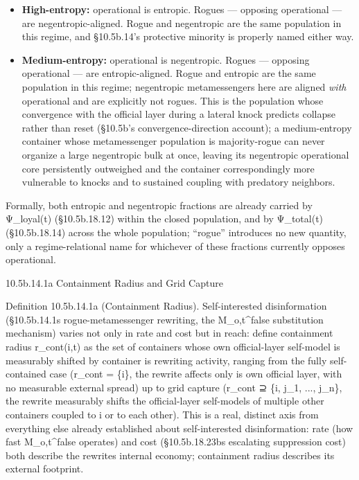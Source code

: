\documentclass[
]{article}
\begin{document}
\begin{itemize}
\item
  \textbf{High-entropy:} operational is entropic. Rogues --- opposing
  operational --- are negentropic-aligned. Rogue and negentropic are the
  same population in this regime, and §10.5b.14's protective minority is
  properly named either way.
\item
  \textbf{Medium-entropy:} operational is negentropic. Rogues ---
  opposing operational --- are entropic-aligned. Rogue and entropic are
  the same population in this regime; negentropic metamessengers here
  are aligned \emph{with} operational and are explicitly not rogues.
  This is the population whose convergence with the official layer
  during a lateral knock predicts collapse rather than reset (§10.5b's
  convergence-direction account); a medium-entropy container whose
  metamessenger population is majority-rogue can never organize a large
  negentropic bulk at once, leaving its negentropic operational core
  persistently outweighed and the container correspondingly more
  vulnerable to knocks and to sustained coupling with predatory
  neighbors.
\end{itemize}

Formally, both entropic and negentropic fractions are already carried by
Ψ\_loyal(t) (§10.5b.18.12) within the closed population, and by
Ψ\_total(t) (§10.5b.18.14) across the whole population; ``rogue''
introduces no new quantity, only a regime-relational name for whichever
of these fractions currently opposes operational.

10.5b.14.1a Containment Radius and Grid Capture

Definition 10.5b.14.1a (Containment Radius). Self-interested
disinformation (§10.5b.14.1s rogue-metamessenger rewriting, the
M\_o,t\^{}false substitution mechanism) varies not only in rate and cost
but in reach: define containment radius r\_cont(i,t) as the set of
containers whose own official-layer self-model is measurably shifted by
container is rewriting activity, ranging from the fully self-contained
case (r\_cont = \{i\}, the rewrite affects only is own official layer,
with no measurable external spread) up to grid capture (r\_cont ⊇ \{i,
j\_1, ..., j\_n\}, the rewrite measurably shifts the official-layer
self-models of multiple other containers coupled to i or to each other).
This is a real, distinct axis from everything else already established
about self-interested disinformation: rate (how fast M\_o,t\^{}false
operates) and cost (§10.5b.18.23bs escalating suppression cost) both
describe the rewrites internal economy; containment radius describes its
external footprint.
\end{document}
